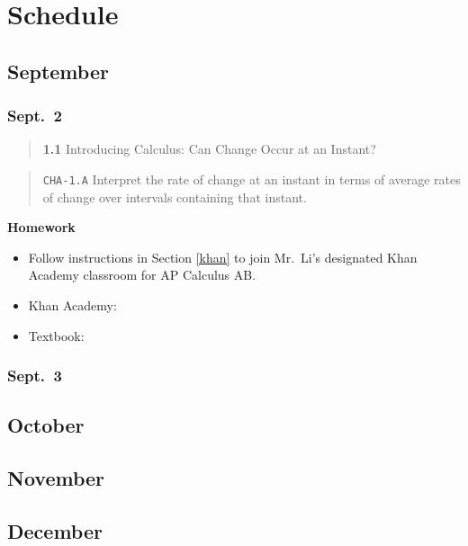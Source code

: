 \documentclass[12pt,fleqn]{article}
\providecommand{\tightlist}{%
  \setlength{\itemsep}{0pt}\setlength{\parskip}{0pt}}
\begin{document}
\hypertarget{sch}{%
\section{Schedule}\label{sch}}

\hypertarget{september}{%
\subsection*{September}\label{september}}

\hypertarget{sept.-2}{%
\subsubsection*{Sept.~2}\label{sept.-2}}

\begin{quote}
\textbf{1.1} Introducing Calculus: Can Change Occur at an Instant?
\end{quote}

\begin{quote}
\texttt{CHA-1.A} Interpret the rate of change at an instant in terms of average rates of change over intervals containing that instant.
\end{quote}

\textbf{Homework}

\begin{itemize}
\tightlist
\item
  Follow instructions in Section \ref{khan} to join Mr.~Li's designated Khan Academy classroom for AP Calculus AB.
\item
  Khan Academy:
\item
  Textbook:
\end{itemize}

\hypertarget{sept.-3}{%
\subsubsection*{Sept.~3}\label{sept.-3}}

\hypertarget{october}{%
\subsection*{October}\label{october}}

\hypertarget{november}{%
\subsection*{November}\label{november}}

\hypertarget{december}{%
\subsection*{December}\label{december}}

\end{document}
